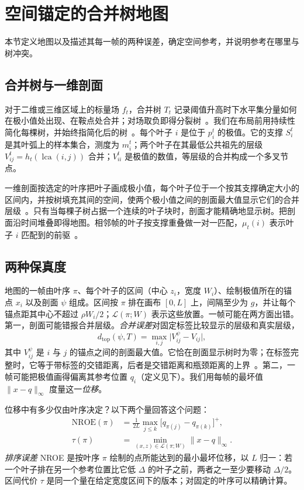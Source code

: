 \documentclass[preprint]{vgtc_zh}   %
\newcommand{\dtop}{d_{\mathrm{top}}}
\newcommand{\lca}{\operatorname{lca}}
\newcommand{\nroe}{\mathrm{NROE}}
\begin{document}
\section{空间锚定的合并树地图}\label{sec:formulation}
本节定义地图以及描述其每一帧的两种误差，确定空间参考，并说明参考在哪里与树冲突。

\subsection{合并树与一维剖面}\label{sec:background}
对于二维或三维区域上的标量场 $f_t$，合并树 $T_t$ 记录阈值升高时下水平集分量如何在极小值处出现、在鞍点处合并；对场取负即得分裂树~\cite{Heine:2016:Survey,Tierny:2018:TTK}。我们在布局前用持续性简化每棵树，并始终指简化后的树~\cite{Edelsbrunner:2002:TPS}。每个叶子 $i$ 是位于 $p_i^t$ 的极值。它的支撑 $S_i^t$ 是其叶弧上的样本集合，测度为 $m_i^t$；两个叶子在其最低公共祖先的层级 $V_{ij}^t=h_t(\lca(i,j))$ 合并；$V_{ii}^t$ 是极值的数值，等层级的合并构成一个多叉节点。

一维剖面按选定的叶序把叶子画成极小值，每个叶子位于一个按其支撑确定大小的区间内，并按树填充其间的空间，使两个极小值之间的剖面最大值显示它们的合并层级~\cite{Weber:2007:TL,Oesterling:2013:TLP,Koepp:2023:TMTM}。只有当每棵子树占据一个连续的叶子块时，剖面才能精确地显示树。把剖面沿时间堆叠即得地图。相邻帧的叶子按支撑重叠做一对一匹配，$\mu_t(i)$ 表示叶子 $i$ 匹配到的前驱~\cite{STMTM:2026}。

\subsection{两种保真度}\label{sec:common}
地图的一帧由叶序 $\pi$、每个叶子的区间（中心 $z_i$，宽度 $W_i$）、绘制极值所在的锚点 $x_i$ 以及剖面 $\psi$ 组成。区间按 $\pi$ 排在画布 $[0,L]$ 上，间隔至少为 $g$，并让每个锚点距其中心不超过 $\rho W_i/2$；$\mathcal{L}(\pi;W)$ 表示这些放置。一帧可能在两方面出错。第一，剖面可能错报合并层级。\emph{合并误差}对固定标签比较显示的层级和真实层级，
\begin{equation}\label{eq:dtop}
 \dtop(\psi,T)=\max_{i,j}\bigl|V_{ij}^{\psi}-V_{ij}\bigr|,
\end{equation}
其中 $V_{ij}^{\psi}$ 是 $i$ 与 $j$ 的锚点之间的剖面最大值。它恰在剖面显示树时为零；在标签完整时，它等于带标签的交错距离，后者是交错距离和瓶颈距离的上界~\cite{Munch:2019:LINF,Gasparovic:2024:IID,Morozov:2013:IDMT}。第二，一帧可能把极值画得偏离其参考位置 $q_i$（定义见下）。我们用每帧的最坏值 $\|x-q\|_\infty$ 度量这一\emph{位移}。

位移中有多少仅由叶序决定？以下两个量回答这个问题：
\begin{equation}\label{eq:nroe}
\begin{aligned}
 \nroe(\pi)&=\frac{1}{2L}\max_{j\le k}\bigl[q_{\pi(j)}-q_{\pi(k)}\bigr]^+,\\
 \tau(\pi)&=\min_{(x,z)\in\mathcal{L}(\pi;W)}\|x-q\|_\infty .
\end{aligned}
\end{equation}
\emph{排序误差} NROE 是按叶序 $\pi$ 绘制的点所能达到的最小最坏位移，以 $L$ 归一：若一个叶子排在另一个参考位置比它低 $\Delta$ 的叶子之前，两者之一至少要移动 $\Delta/2$。区间代价 $\tau$ 是同一个量在给定宽度区间下的版本；对固定的叶序可以精确计算。
\end{document}
